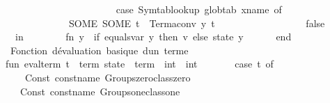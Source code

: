 \begin{isabellebody}
\ \ \ \ \ \ \ \ \ \ {\isacharbar}{\kern0pt}\ {\isacharunderscore}{\kern0pt}\ {\isacharequal}{\kern0pt}{\isachargreater}{\kern0pt}\isanewline
\ \ \ \ \ \ \ \ \ \ \ \ \ \ {\isacharparenleft}{\kern0pt}case\ Symtab{\isachardot}{\kern0pt}lookup\ globtab\ x{\isacharunderscore}{\kern0pt}name\ of\isanewline
\ \ \ \ \ \ \ \ \ \ \ \ \ \ \ \ \ SOME\ {\isacharparenleft}{\kern0pt}SOME\ t{\isacharprime}{\kern0pt}{\isacharprime}{\kern0pt}{\isacharparenright}{\kern0pt}\ {\isacharequal}{\kern0pt}{\isachargreater}{\kern0pt}\ Term{\isachardot}{\kern0pt}aconv\ {\isacharparenleft}{\kern0pt}y{\isacharcomma}{\kern0pt}\ t{\isacharprime}{\kern0pt}{\isacharprime}{\kern0pt}{\isacharparenright}{\kern0pt}\isanewline
\ \ \ \ \ \ \ \ \ \ \ \ \ \ \ {\isacharbar}{\kern0pt}\ {\isacharunderscore}{\kern0pt}\ {\isacharequal}{\kern0pt}{\isachargreater}{\kern0pt}\ false{\isacharparenright}{\kern0pt}\isanewline
\ \ \ \ \ \ in\isanewline
\ \ \ \ \ \ \ \ fn\ y\ {\isacharequal}{\kern0pt}{\isachargreater}{\kern0pt}\ if\ equals{\isacharunderscore}{\kern0pt}var\ y\ then\ v\ else\ state\ y\isanewline
\ \ \ \ \ \ end\isanewline
\isanewline
\ \ \ \ {\isacharparenleft}{\kern0pt}{\isacharasterisk}{\kern0pt}\ Fonction\ d{\isacharprime}{\kern0pt}évaluation\ basique\ d{\isacharprime}{\kern0pt}un\ terme\ {\isacharasterisk}{\kern0pt}{\isacharparenright}{\kern0pt}\isanewline
\ \ \ \ fun\ eval{\isacharunderscore}{\kern0pt}term\ {\isacharparenleft}{\kern0pt}t\ {\isacharcolon}{\kern0pt}\ term{\isacharparenright}{\kern0pt}\ {\isacharparenleft}{\kern0pt}state\ {\isacharcolon}{\kern0pt}\ term\ {\isacharminus}{\kern0pt}{\isachargreater}{\kern0pt}\ int{\isacharparenright}{\kern0pt}\ {\isacharcolon}{\kern0pt}\ int\ {\isacharequal}{\kern0pt}\isanewline
\ \ \ \ \ \ case\ t\ of\isanewline
\ \ \ \ \ \ \ \ Const\ {\isacharparenleft}{\kern0pt}{\isacharat}{\kern0pt}{\isacharbraceleft}{\kern0pt}const{\isacharunderscore}{\kern0pt}name\ {\isachardoublequote}{\kern0pt}Groups{\isachardot}{\kern0pt}zero{\isacharunderscore}{\kern0pt}class{\isachardot}{\kern0pt}zero{\isachardoublequote}{\kern0pt}{\isacharbraceright}{\kern0pt}{\isacharcomma}{\kern0pt}\ {\isacharunderscore}{\kern0pt}{\isacharparenright}{\kern0pt}\ {\isacharequal}{\kern0pt}{\isachargreater}{\kern0pt}\ {}\isanewline
\ \ \ \ \ \ {\isacharbar}{\kern0pt}\ Const\ {\isacharparenleft}{\kern0pt}{\isacharat}{\kern0pt}{\isacharbraceleft}{\kern0pt}const{\isacharunderscore}{\kern0pt}name\ {\isachardoublequote}{\kern0pt}Groups{\isachardot}{\kern0pt}one{\isacharunderscore}{\kern0pt}class{\isachardot}{\kern0pt}one{\isachardoublequote}{\kern0pt}{\isacharbraceright}{\kern0pt}{\isacharcomma}{\kern0pt}\ {\isacharunderscore}{\kern0pt}{\isacharparenright}{\kern0pt}\ {\isacharequal}{\kern0pt}{\isachargreater}{\kern0pt}\ {}\isanewline

\end{isabellebody}
